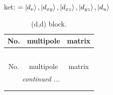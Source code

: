 \documentclass[fleqn,8pt,landscape]{jsarticle}
\begin{document}
\noindent
ket: $=\ket{d_{v}}, \ket{d_{xy}}, \ket{d_{xz}}, \ket{d_{yz}}, \ket{d_{u}}$
\renewcommand{\arraystretch}{1.6}
\begin{longtable}{ccc}
\caption{(d,d) block.}
 \\
 \hline \hline
No. & multipole & matrix \\ \hline \endfirsthead

\multicolumn{2}{l}{\tablename\ \thetable{}} \\
 \hline \hline
No. & multipole & matrix \\ \hline \endhead

 \hline \hline
\multicolumn{2}{r}{\footnotesize\it continued ...} \\ \endfoot

 \hline \hline
\multicolumn{2}{r}{} \\ \endlastfoot


\end{longtable}
\end{document}
